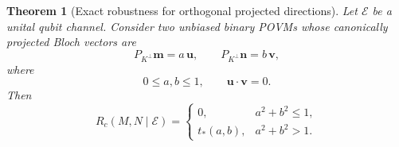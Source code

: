 \documentclass[
aps,pra,twocolumn,10pt,
superscriptaddress,longbibliography,floatfix
]{revtex4-2}
\newtheorem{theorem}{Theorem}[section]
\begin{document}
\begin{theorem}[Exact robustness for orthogonal projected directions]
\label{thm:orthogonal_projected_robustness}
Let $\mathcal E$ be a unital qubit channel. Consider two unbiased binary POVMs whose canonically projected Bloch vectors are
\[
P_{K^\perp}\mathbf m=a\,\mathbf u,
\qquad
P_{K^\perp}\mathbf n=b\,\mathbf v,
\]
where
\[
0\le a,b\le1,
\qquad
\mathbf u\cdot\mathbf v=0.
\]
Then
\begin{equation}
R_c(M,N\mid\mathcal E)
=
\begin{cases}
0,
& a^2+b^2\le1,\\[1ex]
t_*(a,b),
& a^2+b^2>1.
\end{cases}
\label{eq:orthogonal_projected_robustness}
\end{equation}
\end{theorem}
\end{document}
